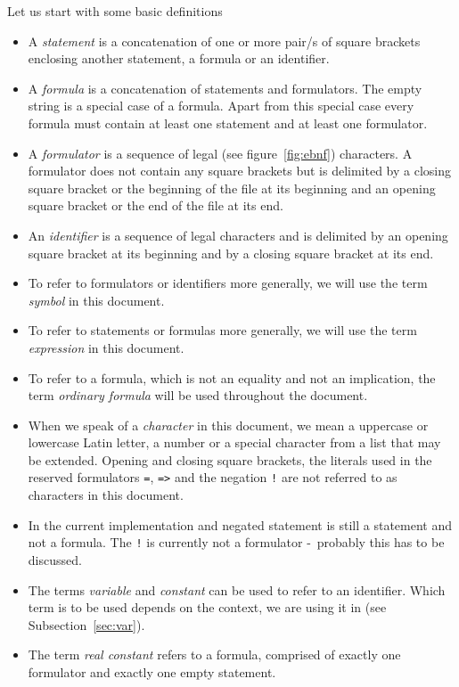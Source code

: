\documentclass[british]{article}
\newcommand\prv{bc}
\newcommand\m[1]{\texttt{#1}}
\begin{document}
Let us start with some basic definitions
\begin{itemize}
	\item
		A \emph{statement} is a concatenation of one or more pair/s of square
		brackets enclosing another statement, a formula or an identifier.
	\item
		A \emph{formula} is a concatenation of statements and formulators.
		The empty string is a special case of a formula. Apart from this special
		case every formula must contain at least one statement and at least
		one formulator.
	\item
		A \emph{formulator }is a sequence of legal (see figure~\ref{fig:ebnf})
		characters. A formulator does not contain any square brackets but
		is delimited by a closing square bracket or the beginning of the file
		at its beginning and an opening square bracket or the end of the file
		at its end.
	\item An \emph{identifier} is a sequence of legal characters and is
		delimited by an opening square bracket at its beginning and by a closing
		square bracket at its end.
	\item
		To refer to formulators or identifiers more generally, we will use
		the term \emph{symbol }in this document.
	\item
		To refer to statements or formulas more generally, we will use the
		term \emph{expression }in this document.
	\item
		To refer to a formula, which is not an equality and not an implication,
		the term \emph{ordinary formula} will be used throughout the document.
	\item
		When we speak of a \emph{character} in this document, we mean a
		uppercase or lowercase Latin letter, a number or a special character
		from a list that may be extended. Opening and closing square brackets,
		the literals used in the reserved formulators \m{=}, \m{=>} and the
		negation \m{!} are not referred to as characters in this document.
	\item
		In the current implementation and negated statement is still a statement
		and not a formula. The \m{!} is currently not a formulator -\ probably
		this has to be discussed.
	\item
		The terms \emph{variable} and \emph{constant} can be used to refer
		to an identifier. Which term is to be used depends on the context,
		we are using it in (see Subsection~\ref{sec:var}).
	\item
		The term \emph{real constant} refers to a formula, comprised of exactly
		one formulator and exactly one empty statement.
\end{itemize}
\end{document}
